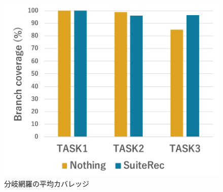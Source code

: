 \documentclass[12pt]{jarticle} %
\begin{document}
\begin{figure}[htbp]
  \begin{center}
   \includegraphics[width=12cm]{C1.pdf}
  \caption{分岐網羅の平均カバレッジ}
  \label{C1}
  \end{center}
\end{figure}

\end{document}
